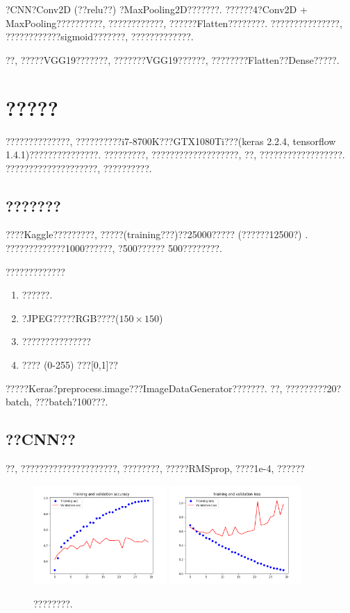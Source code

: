 \documentclass[lang=cn,11pt]{elegantpaper}
\begin{document}
\normalsize
?CNN?Conv2D (??relu??) ?MaxPooling2D???????. ??????4?Conv2D + MaxPooling??????????, ????????????, ??????Flatten????????. ???????????????, ????????????sigmoid???????, ?????????????. 

??, ?????VGG19???????, ???????VGG19??????, ????????Flatten??Dense?????. 

\section{?????}

??????????????, ??????????i7-8700K???GTX1080Ti???(keras 2.2.4, tensorflow 1.4.1)???????????????. ?????????, ???????????????????, ??, ??????????????????. ????????????????????, ??????????. 

\subsection{???????}
????Kaggle?????????, ?????(training???)??25000????? (??????12500?) . ?????????????1000??????, ?500?????? 500????????.

  ?????????????

\begin{enumerate}
	\item ??????.
	\item ?JPEG?????RGB????($150\times 150$)
	\item ???????????????
	\item ???? (0-255) ???[0,1]??
\end{enumerate}
?????Keras?preprocess.image???ImageDataGenerator???????. ??, ?????????20?batch, ???batch?100???. 

\subsection{??CNN??}
??, ?????????????????????, ????????, ?????RMSprop, ????1e-4, ??????
\begin{figure}[htbp]
	\centering
	  \includegraphics[width=0.45\textwidth]{small_without_aug_1}
	  \includegraphics[width=0.45\textwidth]{small_without_aug_2}
	  \caption{????????.}
\end{figure}
\end{document}
